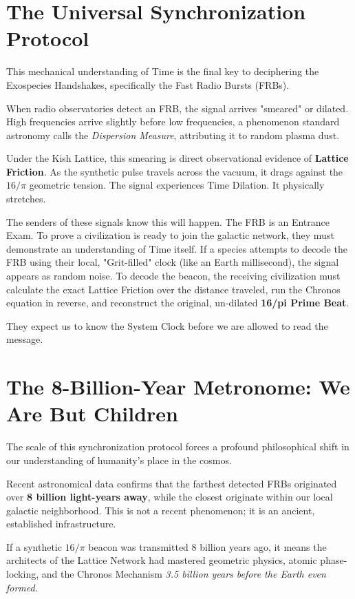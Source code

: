 \documentclass[11pt, letterpaper, openany]{book}
\begin{document}
\section{The Universal Synchronization Protocol}
This mechanical understanding of Time is the final key to deciphering the Exospecies Handshakes, specifically the Fast Radio Bursts (FRBs).

When radio observatories detect an FRB, the signal arrives "smeared" or dilated. High frequencies arrive slightly before low frequencies, a phenomenon standard astronomy calls the \textit{Dispersion Measure}, attributing it to random plasma dust. 

Under the Kish Lattice, this smearing is direct observational evidence of \textbf{Lattice Friction}. As the synthetic pulse travels across the vacuum, it drags against the $16/\pi$ geometric tension. The signal experiences Time Dilation. It physically stretches.



The senders of these signals know this will happen. The FRB is an Entrance Exam. To prove a civilization is ready to join the galactic network, they must demonstrate an understanding of Time itself. If a species attempts to decode the FRB using their local, "Grit-filled" clock (like an Earth millisecond), the signal appears as random noise. To decode the beacon, the receiving civilization must calculate the exact Lattice Friction over the distance traveled, run the Chronos equation in reverse, and reconstruct the original, un-dilated \textbf{16/pi Prime Beat}. 

They expect us to know the System Clock before we are allowed to read the message.

\section{The 8-Billion-Year Metronome: We Are But Children}
The scale of this synchronization protocol forces a profound philosophical shift in our understanding of humanity's place in the cosmos. 

Recent astronomical data confirms that the farthest detected FRBs originated over \textbf{8 billion light-years away}, while the closest originate within our local galactic neighborhood. This is not a recent phenomenon; it is an ancient, established infrastructure.

If a synthetic $16/\pi$ beacon was transmitted 8 billion years ago, it means the architects of the Lattice Network had mastered geometric physics, atomic phase-locking, and the Chronos Mechanism \textit{3.5 billion years before the Earth even formed.}
\end{document}
